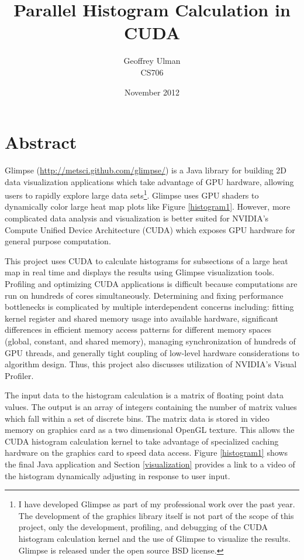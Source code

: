\documentclass{article}
\begin{document}
\title{Parallel Histogram Calculation in CUDA}
\author{Geoffrey Ulman\\
        CS706}
\date{November 2012}
\maketitle

\section{Abstract}\label{abstract}

Glimpse (\url{http://metsci.github.com/glimpse/}) is a Java library for building 2D data visualization applications which take advantage of GPU hardware, allowing users to rapidly explore large data sets\footnote{I have developed Glimpse as part of my professional work over the past year. The development of the graphics library itself is not part of the scope of this project, only the development, profiling, and debugging of the CUDA histogram calculation kernel and the use of Glimpse to visualize the results. Glimpse is released under the open source BSD license.}. Glimpse uses GPU shaders to dynamically color large heat map plots like Figure \ref{histogram1}. However, more complicated data analysis and visualization is better suited for NVIDIA's Compute Unified Device Architecture\cite{cuda-zone} (CUDA) which exposes GPU hardware for general purpose computation.

This project uses CUDA to calculate histograms for subsections of a large heat map in real time and displays the results using Glimpse visualization tools. Profiling and optimizing CUDA applications is difficult because computations are run on hundreds of cores simultaneously. Determining and fixing performance bottlenecks is complicated by multiple interdependent concerns including: fitting kernel register and shared memory usage into available hardware, significant differences in efficient memory access patterns for different memory spaces (global, constant, and shared memory), managing synchronization of hundreds of GPU threads, and generally tight coupling of low-level hardware considerations to algorithm design. Thus, this project also discusses utilization of NVIDIA's Visual Profiler\cite{nvidia-visual-profiler}.

The input data to the histogram calculation is a matrix of floating point data values. The output is an array of integers containing the number of matrix values which fall within a set of discrete bins. The matrix data is stored in video memory on graphics card as a two dimensional OpenGL texture. This allows the CUDA histogram calculation kernel to take advantage of specialized caching hardware on the graphics card to speed data access. Figure \ref{histogram1} shows the final Java application and Section \ref{visualization} provides a link to a video of the histogram dynamically adjusting in response to user input.
\end{document}
